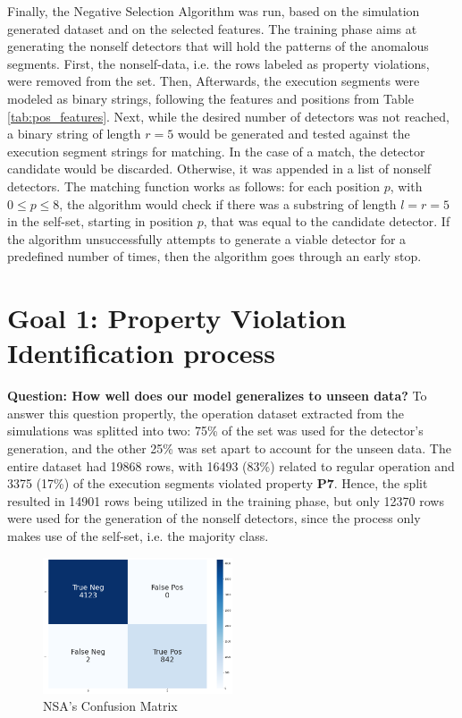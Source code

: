 Finally, the Negative Selection Algorithm was run, based on the simulation generated dataset and on the selected features. The training phase aims at generating the nonself detectors that will hold the patterns of the anomalous segments. First, the nonself-data, i.e. the rows labeled as property violations, were removed from the set. Then, Afterwards, the execution segments were modeled as binary strings, following the features and positions from Table \ref{tab:pos_features}. Next, while the desired number of detectors was not reached, a binary string of length \(r = 5\) would be generated and tested against the execution segment strings for matching. In the case of a match, the detector candidate would be discarded. Otherwise, it was appended in a list of nonself detectors. The matching function works as follows: for each position \(p\), with \(0 \leq p \leq 8\), the algorithm would check if there was a substring of length \(l=r=5\) in the self-set, starting in position \(p\), that was equal to the candidate detector. If the algorithm unsuccessfully attempts to generate a viable detector for a predefined number of times, then the algorithm goes through an early stop.

\section{Goal 1: Property Violation Identification process}

\textbf{Question: How well does our model generalizes to unseen data?} To answer this question propertly, the operation dataset extracted from the simulations was splitted into two: 75\% of the set was used for the detector's generation, and the other 25\% was set apart to account for the unseen data. The entire dataset had 19868 rows, with 16493 (83\%) related to regular operation and 3375 (17\%) of the execution segments violated property \textbf{P7}. Hence, the split resulted in 14901 rows being utilized in the training phase, but only 12370 rows were used for the generation of the nonself detectors, since the process only makes use of the self-set, i.e. the majority class.

\begin{figure}[!h]
	\centering
	\includegraphics[width=0.5\textwidth, keepaspectratio]{img/NSA_confusion_matrix.png}
	\caption{NSA's Confusion Matrix}
	\label{fig:nsa_conf}
\end{figure}

